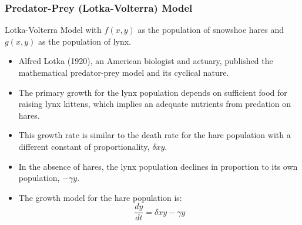







\begin{frame}
    \frametitle{Predator-Prey (Lotka-Volterra) Model}
Lotka-Volterra Model with $ f ( x , y ) $ as the population of snowshoe
hares and $ g ( x , y ) $ as the population of lynx.   
    \begin{itemize}
    \item 
     Alfred Lotka (1920), an American biologist and actuary,
published the mathematical predator-prey model and its
cyclical nature.
        \item  The primary growth for the lynx population depends on
sufficient food for raising lynx kittens, which implies an adequate
nutrients from predation on hares.
        \item This growth rate is similar to the death rate for the hare
population with a different constant of proportionality,
$\delta x y $.
        \item In the absence of hares, the lynx population declines in
proportion to its own population, $ - \gamma y $.
        \item The growth model for the hare population is:
\[ \frac { d y } { d t } = \delta x y - \gamma y \]
    \end{itemize} 
\end{frame}

